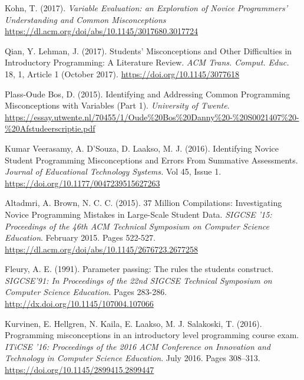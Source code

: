 \documentclass[twocolumn]{article}
\begin{document}
\begin{thebibliography}{9}

Kohn, T.  (2017). \emph{Variable Evaluation: an Exploration of Novice Programmers’ Understanding and Common Misconceptions}
\url{https://dl.acm.org/doi/abs/10.1145/3017680.3017724}

Qian, Y. Lehman, J. (2017). Students’ Misconceptions and Other Difficulties in Introductory Programming: A Literature Review. \emph{ACM Trans. Comput. Educ.} 18, 1, Article 1 (October 2017).
\url{https://doi.org/10.1145/3077618}

Plass-Oude Bos, D.  (2015). Identifying and Addressing Common Programming Misconceptions with Variables (Part 1). \emph{University of Twente}.
\url{https://essay.utwente.nl/70455/1/Oude%20Bos%20Danny%20-%20S0021407%20-%20Afstudeerscriptie.pdf}

Kumar Veerasamy, A. D’Souza, D. Laakso, M. J. (2016). Identifying Novice Student Programming Misconceptions and Errors From Summative Assessments. \emph{Journal of Educational Technology Systems.} Vol 45, Issue 1.  
\url{https://doi.org/10.1177/0047239515627263}

Altadmri, A. Brown, N. C. C. (2015). 37 Million Compilations: Investigating Novice Programming Mistakes in Large-Scale Student Data. \emph{SIGCSE '15: Proceedings of the 46th ACM Technical Symposium on Computer Science Education}. February 2015. Pages 522-527.
\url{https://dl.acm.org/doi/abs/10.1145/2676723.2677258}

Fleury, A. E. (1991). Parameter passing: The rules the students construct. \emph{SIGCSE’91:  In Proceedings of the 22nd SIGCSE Technical Symposium on Computer Science Education}. Pages 283-286.
\url{http://dx.doi.org/10.1145/107004.107066}

Kurvinen, E. Hellgren, N. Kaila, E. Laakso, M. J. Salakoski, T. (2016). Programming misconceptions in an introductory level programming course exam. \emph{ITiCSE '16: Proceedings of the 2016 ACM Conference on Innovation and Technology in Computer Science Education}. July 2016. Pages 308–313. 
\url{https://doi.org/10.1145/2899415.2899447}

\end{thebibliography}
\end{document}
